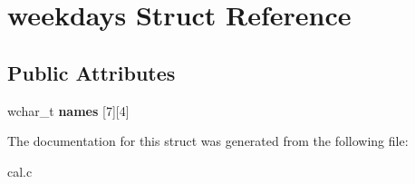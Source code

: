 \hypertarget{structweekdays}{
\section{weekdays Struct Reference}
\label{structweekdays}
}
\subsection*{Public Attributes}
\begin{DoxyCompactItemize}
\item 
\hypertarget{structweekdays_a7a0545cb97b8ca1949f4103a42de7064}{
wchar\_\-t {\bfseries names} \mbox{[}7\mbox{]}\mbox{[}4\mbox{]}}
\label{structweekdays_a7a0545cb97b8ca1949f4103a42de7064}

\end{DoxyCompactItemize}


The documentation for this struct was generated from the following file:\begin{DoxyCompactItemize}
\item 
cal.c\end{DoxyCompactItemize}
